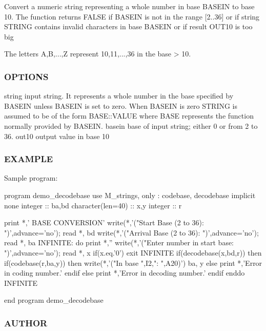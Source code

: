 \begin{DoxyVerb}Convert a numeric string representing a whole number in base BASEIN
to base 10. The function returns FALSE if BASEIN is not in the range
[2..36] or if string STRING contains invalid characters in base BASEIN
or if result OUT10 is too big

The letters A,B,...,Z represent 10,11,...,36 in the base > 10.
\end{DoxyVerb}


\subsubsection*{O\+P\+T\+I\+O\+NS}

string input string. It represents a whole number in the base specified by B\+A\+S\+E\+IN unless B\+A\+S\+E\+IN is set to zero. When B\+A\+S\+E\+IN is zero S\+T\+R\+I\+NG is assumed to be of the form B\+A\+S\+E\+::\+V\+A\+L\+UE where B\+A\+SE represents the function normally provided by B\+A\+S\+E\+IN. basein base of input string; either 0 or from 2 to 36. out10 output value in base 10

\subsubsection*{E\+X\+A\+M\+P\+LE}

Sample program\+: \begin{DoxyVerb}program demo_decodebase
use M_strings, only : codebase, decodebase
implicit none
integer           :: ba,bd
character(len=40) :: x,y
integer           :: r

print *,' BASE CONVERSION'
write(*,'("Start   Base (2 to 36): ")',advance='no'); read *, bd
write(*,'("Arrival Base (2 to 36): ")',advance='no'); read *, ba
INFINITE: do
   print *,''
   write(*,'("Enter number in start base: ")',advance='no'); read *, x
   if(x.eq.'0') exit INFINITE
   if(decodebase(x,bd,r)) then
      if(codebase(r,ba,y)) then
        write(*,'("In base ",I2,": ",A20)')  ba, y
      else
        print *,'Error in coding number.'
      endif
   else
      print *,'Error in decoding number.'
   endif
enddo INFINITE

end program demo_decodebase
\end{DoxyVerb}


\subsubsection*{A\+U\+T\+H\+OR}

